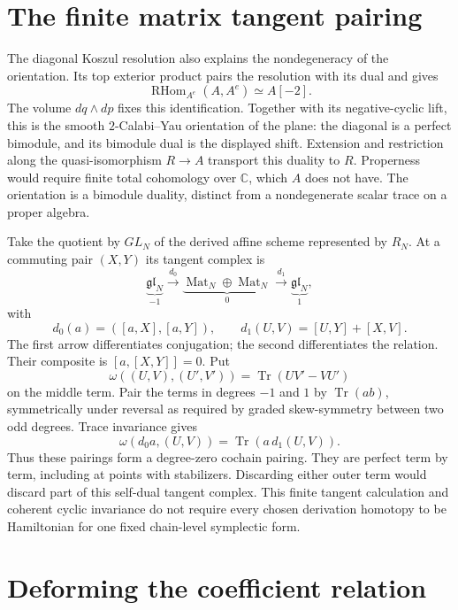 \section{The finite matrix tangent pairing}
\label{sec:vol2-matrix-tangent-pairing}

The diagonal Koszul resolution also explains the nondegeneracy
of the orientation. Its top exterior product pairs the
resolution with its dual and gives
\[
 \operatorname{RHom}_{A^e}(A,A^e)\simeq A[-2].
\]
The volume $dq\wedge dp$ fixes this identification. Together
with its negative-cyclic lift, this is the smooth
$2$-Calabi--Yau orientation of the plane: the diagonal is a
perfect bimodule, and its bimodule dual is the displayed shift.
Extension and restriction along the quasi-isomorphism $R\to A$
transport this duality to $R$. Properness would require finite
total cohomology over $\mathbb C$, which $A$ does not have.
The orientation is a bimodule duality, distinct from a
nondegenerate scalar trace on a proper algebra.

Take the quotient by $GL_N$ of the derived affine scheme
represented by $R_N$. At a commuting pair $(X,Y)$ its tangent
complex is
\begin{equation}\label{eq:vol2-derived-matrix-tangent}
 \underbrace{\mathfrak{gl}_N}_{-1}
 \xrightarrow{\ d_0\ }
 \underbrace{\operatorname{Mat}_N\oplus\operatorname{Mat}_N}_{0}
 \xrightarrow{\ d_1\ }
 \underbrace{\mathfrak{gl}_N}_{1},
\end{equation}
with
\[
 d_0(a)=([a,X],[a,Y]),\qquad
 d_1(U,V)=[U,Y]+[X,V].
\]
The first arrow differentiates conjugation; the second
differentiates the relation. Their composite is
$[a,[X,Y]]=0$. Put
\begin{equation}\label{eq:vol2-matrix-tangent-form}
 \omega((U,V),(U',V'))=\operatorname{Tr}(UV'-VU')
\end{equation}
on the middle term. Pair the terms in degrees $-1$ and $1$
by $\operatorname{Tr}(ab)$, symmetrically under reversal as
required by graded skew-symmetry between two odd degrees.
Trace invariance gives
\[
 \omega(d_0a,(U,V))=\operatorname{Tr}(a\,d_1(U,V)).
\]
Thus these pairings form a degree-zero cochain pairing.
They are perfect term by term, including at points with
stabilizers. Discarding either outer term would discard part
of this self-dual tangent complex. This finite tangent
calculation and coherent cyclic invariance do not require
every chosen derivation homotopy to be Hamiltonian for one
fixed chain-level symplectic form.

\section{Deforming the coefficient relation}
\label{sec:vol2-coefficient-weyl-action}

